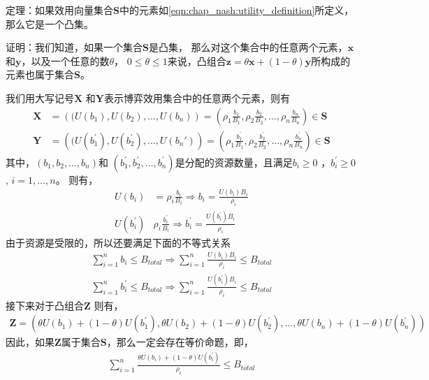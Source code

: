 定理：如果效用向量集合$\mathbf{S}$中的元素如\eqref{eqn:chap_nash:utility_definition}所定义，那么它是一个凸集。

证明：我们知道，如果一个集合$\mathbf{S}$是凸集，
那么对这个集合中的任意两个元素，$\mathbf{x}$和$\mathbf{y}$，以及一个任意的数$\theta$， $0\le \theta\le 1$来说，凸组合$\mathbf{z}=\theta \mathbf{x} + (1-\theta) \mathbf{y}$所构成的元素也属于集合$\mathbf{S}$。

我们用大写记号$\mathbf{X}$ 和$\mathbf{Y}$表示博弈效用集合中的任意两个元素，则有
\begin{align*}
    \mathbf{X} &=\left( (U(b_1), U(b_2), \ldots, U(b_n) \right)
    = \left( \rho_1 \frac{b_1}{B_1},\rho_2 \frac{b_2}{B_2},\ldots, \rho_n \frac{b_n}{B_n} \right) \in \mathbf{S} \\
    \mathbf{Y} &=\left( (U(b_1^\prime), U(b_2^\prime), \ldots, U(b_n\prime) \right)
    = \left( \rho_1 \frac{b_1^\prime}{B_1},\rho_2 \frac{b_2^\prime}{B_2},\ldots, \rho_n \frac{b_n^\prime}{B_n} \right) \in \mathbf{S} 
\end{align*}
其中，$(b_1, b_2, \ldots, b_n)$和 $(b_1^\prime, b_2^\prime, \ldots, b_n^\prime)$是分配的资源数量，且满足$b_i \ge 0$ ，$b_i^\prime \ge 0$, $i = 1, \ldots, n$。
则有，
\begin{align*}
    U(b_i) &= \rho_i \frac{b_i}{B_i} \Rightarrow b_i = \frac{U(b_i)B_i}{\rho_i} \\
    U(b_i^\prime) & \rho_i \frac{b_i^\prime} {B_i} \Rightarrow b_i^\prime = \frac{U(b_i^\prime) B_i}{\rho_i}
\end{align*}
由于资源是受限的，所以还要满足下面的不等式关系
\begin{align*}
    \sum_{i=1}^n b_i \le B_{total} \Rightarrow \sum_{i=1}^n \frac{U(b_i)B_i}{\rho_i} \le B_{total}\\
    \sum_{i=1}^n b_i^\prime \le B_{total}\Rightarrow \sum_{i=1}^n \frac{U(b_i^\prime)B_i}{\rho_i} \le B_{total}
\end{align*}
接下来对于凸组合$\mathbf{Z}$ 则有，
\begin{align*}
    \mathbf{Z} = \left( \theta U(b_1) + (1-\theta) U(b_1^\prime),   \theta U(b_2) + (1-\theta) U(b_2^\prime), \ldots,  \theta U(b_n) + (1-\theta) U(b_n^\prime) \right)
\end{align*}
因此，如果$\mathbf{Z}$属于集合$\mathbf{S}$，那么一定会存在等价命题，即，
\begin{align}
    \sum_{i=1}^{n} \frac{ \theta U(b_i) + (1-\theta) U(b_i^\prime)}{\rho_i}  \le B_{total}
    \label{eqn:chap_nash:proof_z_in_s}
\end{align}
